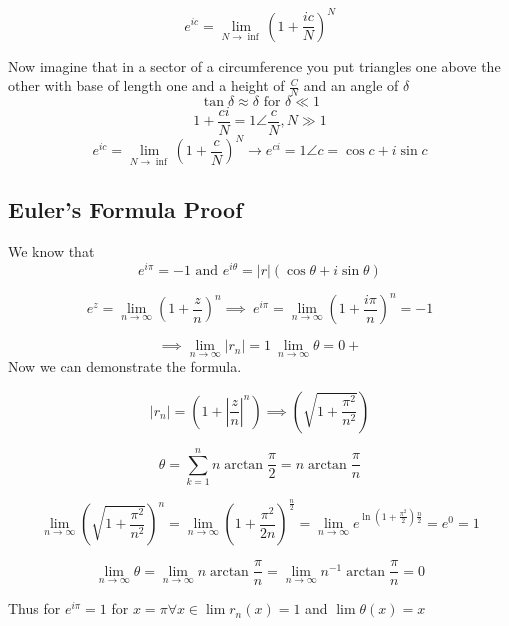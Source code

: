 \[
	e^{ic} = \lim_{N \to \inf} {\left( 1 + \frac{ic}{N}\right)}^N
\]

 Now imagine that in a sector of a circumference you put triangles one above the other with base of length one and a height of \(\frac{C}{N}\) and 
 an angle of \(\delta\)
\[
	\tan{\delta} \approx \delta \text{ for } \delta \ll 1
\]
\[
	1 + \frac{ci}{N} = 1 \angle \frac{c}{N}, N \gg 1
\]
\[
	e^{ic} = \lim_{N \to \inf} {\left( 1 + \frac{c}{N}\right)}^N \to e^{ci} = 1 \angle c = \cos{c} + i\sin{c}
\]

\subsection{Euler's Formula Proof}
We know that
\[
	e^{i\pi} = -1 \text{ and } e^{i\theta} = |r|(\cos{\theta} + i\sin{\theta})
\]

\[
	e^{z} = \lim_{n \to \infty} {\left( 1 + \frac{z}{n}\right)}^n \implies\ e^{i\pi} = \lim_{n \to \infty} {\left( 1 + \frac{i\pi}{n}\right)}^n = -1
\]

\[
	\implies \lim_{n \to \infty} |r_n| = 1\ \lim_{n \to \infty} \theta = 0+
\]
 Now we can demonstrate the formula.

\[
	|r_n| = \left( 1 + \left|\frac{z}{n}\right|^n \right) \implies \left( \sqrt{1 + \frac{\pi^2}{n^2}}\right)
\]

\[
	\theta = \sum_{k = 1}^{n} n \arctan \frac{\pi}{2} = n \arctan \frac{\pi}{n}
\]

\[
	\lim_{n \to \infty} {\left( \sqrt{1 + \frac{\pi^2}{n^2}}\right)}^n = \lim_{n \to \infty} {\left( 1 + \frac{\pi^2}{2n} \right) }^{\frac{n}{2}}
	= \lim_{n \to \infty} e^{\ln\left(1 +\frac{\pi^2}{2}\right) \frac{n}{2}} = e^0 = 1
\]

\[
	\lim_{n \to \infty} \theta = \lim_{n \to \infty} n \arctan \frac{\pi}{n} = \lim_{n \to \infty} n^{-1} \arctan\frac{\pi}{n} = 0
\]

Thus for \(e^{i\pi} = 1\) for \(x = \pi \forall x \in \lim r_n (x) = 1\) and \( \lim \theta (x) = x\)

\QED
